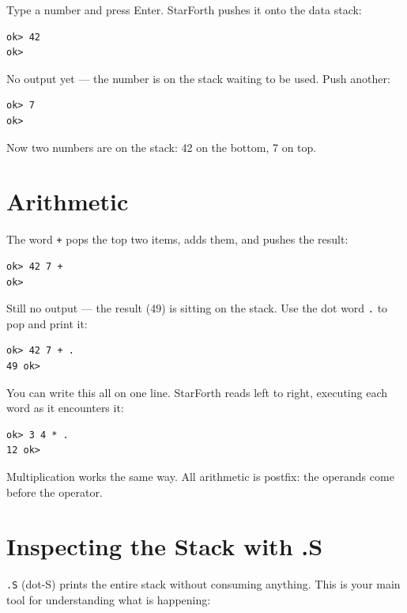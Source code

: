Type a number and press Enter. StarForth pushes it onto the data stack:

\begin{lstlisting}[language=Forth]
ok> 42
ok>
\end{lstlisting}

No output yet --- the number is on the stack waiting to be used. Push another:

\begin{lstlisting}[language=Forth]
ok> 7
ok>
\end{lstlisting}

Now two numbers are on the stack: 42 on the bottom, 7 on top.

\section{Arithmetic}
\label{sec:arithmetic-first}

The word \texttt{+} pops the top two items, adds them, and pushes the result:

\begin{lstlisting}[language=Forth]
ok> 42 7 +
ok>
\end{lstlisting}

Still no output --- the result (49) is sitting on the stack. Use the dot word
\texttt{.} to pop and print it:

\begin{lstlisting}[language=Forth]
ok> 42 7 + .
49 ok>
\end{lstlisting}

You can write this all on one line. StarForth reads left to right, executing
each word as it encounters it:

\begin{lstlisting}[language=Forth]
ok> 3 4 * .
12 ok>
\end{lstlisting}

Multiplication works the same way. All arithmetic is postfix: the operands
come before the operator.

\section{Inspecting the Stack with .S}
\label{sec:dot-s}

\texttt{.S} (dot-S) prints the entire stack without consuming anything. This
is your main tool for understanding what is happening:

